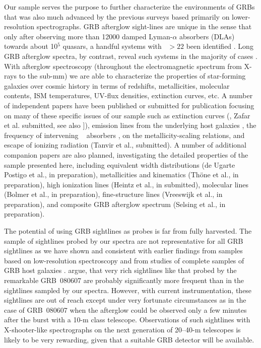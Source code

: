 \documentclass{aa}    %
\begin{document}
Our sample serves the purpose to further characterize the environments of GRBs
that was also much advanced by the previous surveys based primarily on
lower-resolution spectrographs. GRB afterglow sight-lines are unique in the
sense that only after observing more than 12000 damped Lyman-$\alpha$ absorbers
(DLAs) towards about 10$^5$ quasars, a handful systems with \nh~$ > 22$ been
identified \citep[e.g., five in][]{Noterdaeme2012b}. Long GRB afterglow spectra,
by contrast, reveal such systems in the majority of cases \citep[][and this
work]{Jakobsson2006b, Fynbo2009, Cucchiara2015}. With afterglow spectroscopy
(throughout the electromagnetic spectrum from X-rays to the sub-mm) we are able
to characterize the properties of star-forming galaxies over cosmic history in
terms of redshifts, metallicities, molecular contents, ISM temperatures, UV-flux
densities, extinction curves, etc.  A number of independent papers have been
published or submitted for publication focusing on many of these specific issues
of our sample such as extinction curves (\citealt{Japelj2015}, Zafar et al.
submitted, see also \citealt{Fynbo2014, Heintz2017}]), emission lines from the
underlying host galaxies \citep{Kruhler2015}, the frequency of intervening
\mgii~ absorbers \citep{Christensen2017}, \citet{Arabsalmani2018} on the
metallicity-scaling relations, and escape of ionizing radiation (Tanvir et al.,
submitted). A number of additional companion papers are also planned,
investigating the detailed properties of the sample presented here, including
equivalent width distributions (de Ugarte Postigo et al., in preparation),
metallicities and kinematics (Th{\"o}ne et al., in preparation), high ionization
lines (Heintz et al., in submitted), molecular lines (Bolmer et al., in
preparation), fine-structure lines (Vreeswijk et al., in preparation), and
composite GRB afterglow spectrum (Selsing et al., in preparation).

The potential of using GRB sightlines as probes is far from fully harvested. The
sample of sightlines probed by our spectra are not representative for all GRB
sightlines as we have shown and consistent with earlier findings from samples
based on low-resolution spectroscopy \citep[e.g.,][]{Fynbo2009} and from studies
of complete samples of GRB host galaxies \citep{Hjorth2012, Covino2013,
	Perley2016a}. \cite{Kruhler2013} argue, that very rich sightlines like that
probed by the remarkable GRB~080607 \citep{Prochaska2009} are probably
significantly more frequent than in the sightlines sampled by our spectra.
However, with current instrumentation, these sightlines are out of reach except
under very fortunate circumstances as in the case of GRB~080607 when the
afterglow could be observed only a few minutes after the burst with a 10-m class
telescope. Observations of such sightlines with X-shooter-like spectrographs on
the next generation of 20--40-m telescopes is likely to be very rewarding, given
that a suitable GRB detector will be available.
\end{document}
